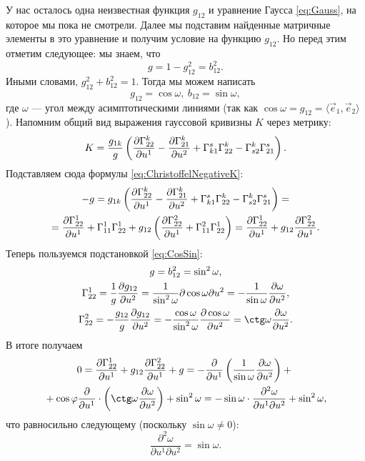 У нас осталось одна неизвестная функция $g_{12}$ и уравнение Гаусса \eqref{eq:Gauss}, на которое мы пока не смотрели. Далее мы подставим найденные матричные элементы в это уравнение и получим условие на функцию $g_{12}$. Но перед этим отметим следующее: мы знаем, что
\[
	g = 1 - g_{12}^2 = b_{12}^2.
\]
Иными словами, $g_{12}^2 + b_{12}^2 = 1$. Тогда мы можем написать
\begin{equation} \label{eq:CosSin}
	g_{12} = \cos\omega,\ b_{12} = \sin\omega,
\end{equation}
где $\omega$ --- угол между асимптотическими линиями (так как $\cos\omega = g_{12} = \langle\vec{e}_1, \vec{e}_2\rangle$). Напомним общий вид выражения гауссовой кривизны $K$ через метрику:
\[
	K = \frac{g_{1k}}{g}\left(\frac{\partial\Gamma^k_{22}}{\partial u^1} - \frac{\partial\Gamma_{21}^k}{\partial u^2} + \Gamma_{k1}^s\Gamma^k_{22} - \Gamma_{s2}^k\Gamma_{21}^s\right).
\]
Подставляем сюда формулы \eqref{eq:ChristoffelNegativeK}:
\begin{multline*}
	-g = g_{1k}\left(\frac{\partial\Gamma^k_{22}}{\partial u^1} - \frac{\partial\Gamma_{21}^k}{\partial u^2} + \Gamma_{k1}^s\Gamma^k_{22} - \Gamma_{s2}^k\Gamma_{21}^s\right) =\\ = \frac{\partial\Gamma_{22}^1}{\partial u^1} + \Gamma_{11}^1\Gamma_{22}^1 + g_{12}\left(\frac{\partial \Gamma_{22}^2}{\partial u^1} + \Gamma_{11}^2\Gamma_{22}^1\right) = \frac{\partial\Gamma_{22}^1}{\partial u^1} + g_{12}\frac{\partial\Gamma_{22}^2}{\partial u^1}.
\end{multline*}
Теперь пользуемся подстановкой \eqref{eq:CosSin}:
\begin{gather*}
	g = b_{12}^2 = \sin^2\omega,\\
	\Gamma_{22}^1 = \frac{1}{g}\frac{\partial g_{12}}{\partial u^2} = \frac{1}{\sin^2\omega}{\partial\cos\omega}{\partial u^2} = -\frac{1}{\sin\omega}\frac{\partial\omega}{\partial u^2},\\
	\Gamma_{22}^2 = -\frac{g_{12}}{g}\frac{\partial g_{12}}{\partial u^2} = -\frac{\cos\omega}{\sin^2\omega}\frac{\partial\cos\omega}{\partial u^2} = \ctg\omega\frac{\partial\omega}{\partial u^2}.
\end{gather*}
В итоге получаем
\begin{multline*}
	0 = \frac{\partial\Gamma_{22}^1}{\partial u^1} + g_{12}\frac{\partial\Gamma_{22}^2}{\partial u^1} + g = -\frac{\partial}{\partial u^1}\br{\frac{1}{\sin\omega}\frac{\partial\omega}{\partial u^2}} + {}\\{} + \cos\varphi\frac{\partial}{\partial u^1} \cdot \br{\ctg\omega\frac{\partial\omega}{\partial u^2}} + \sin^2\omega = -\sin\omega \cdot \frac{\partial^2\omega}{\partial u^1\partial u^2} + \sin^2\omega,
\end{multline*}
что равносильно следующему (поскольку $\sin\omega \ne 0$):
\begin{equation} \label{eq:sinGordon}
	\frac{\partial^2\omega}{\partial u^1\partial u^2} = \sin\omega.
\end{equation}

